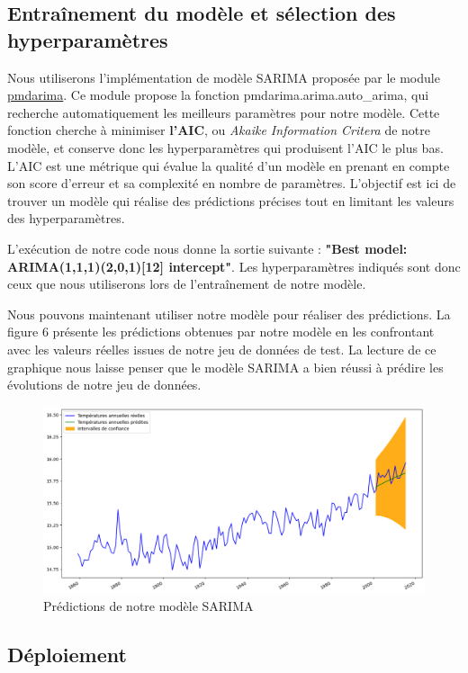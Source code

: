 \documentclass[french]{article}
\begin{document}
    \subsection{Entraînement du modèle et sélection des hyperparamètres}

    Nous utiliserons l'implémentation de modèle SARIMA proposée par le module \href{https://pypi.org/project/pmdarima/}{pmdarima}. Ce module propose la fonction pmdarima.arima.auto\_arima, qui recherche automatiquement les meilleurs paramètres pour notre modèle. Cette fonction cherche à minimiser \textbf{l'AIC}, ou \textit{Akaike Information Critera} de notre modèle, et conserve donc les hyperparamètres qui produisent l'AIC le plus bas. L'AIC est une métrique qui évalue la qualité d'un modèle en prenant en compte son score d'erreur et sa complexité en nombre de paramètres. L'objectif est ici de trouver un modèle qui réalise des prédictions précises tout en limitant les valeurs des hyperparamètres.

    L'exécution de notre code nous donne la sortie suivante : \textbf{"Best model:  ARIMA(1,1,1)(2,0,1)[12] intercept"}. Les hyperparamètres indiqués sont donc ceux que nous utiliserons lors de l'entraînement de notre modèle.

    Nous pouvons maintenant utiliser notre modèle pour réaliser des prédictions. La figure 6 présente les prédictions obtenues par notre modèle en les confrontant avec les valeurs réelles issues de notre jeu de données de test. La lecture de ce graphique nous laisse penser que le modèle SARIMA a bien réussi à prédire les évolutions de notre jeu de données.

    \begin{figure}[h]
        \includegraphics[width=12cm]{forecast}
        \centering
        \caption{Prédictions de notre modèle SARIMA}
        \centering
    \end{figure}

    \subsection{Déploiement}
\end{document}
